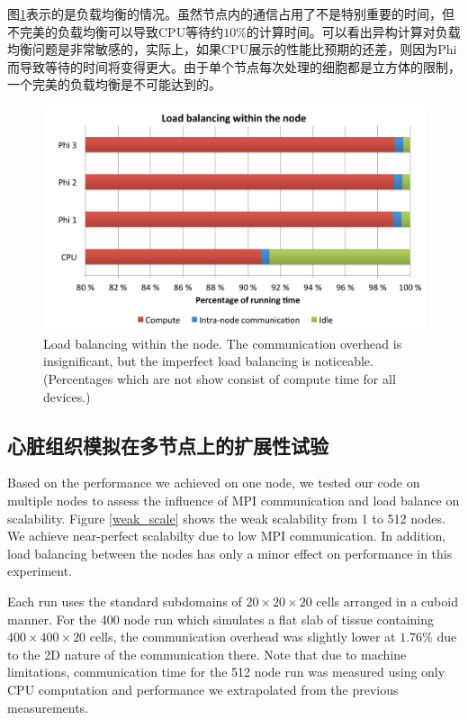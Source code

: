 图\ref{loadbalance}表示的是负载均衡的情况。虽然节点内的通信占用了不是特别重要的时间，但不完美的负载均衡可以导致CPU等待约$10\%$的计算时间。可以看出异构计算对负载均衡问题是非常敏感的，实际上，如果CPU展示的性能比预期的还差，则因为Phi而导致等待的时间将变得更大。由于单个节点每次处理的细胞都是立方体的限制，一个完美的负载均衡是不可能达到的。

\begin{figure}
 \includegraphics[width=\linewidth]{figs/loadbalance.pdf}
  \caption{Load balancing within the node. The communication overhead is insignificant, but the imperfect load balancing is noticeable. (Percentages which are not show consist of compute time for all devices.)}
  \label{loadbalance}
\end{figure}

\subsection{心脏组织模拟在多节点上的扩展性试验}

Based on the performance we achieved on one node, we tested our code on multiple nodes to assess the influence of MPI communication and load balance on scalability. Figure \ref{weak_scale} shows the weak scalability from 1 to 512 nodes. We achieve near-perfect scalabilty due to low MPI communication. In addition, load balancing between the nodes 
has only a minor effect on performance in this experiment.   

Each run uses the standard subdomains of $20\times20\times20$ cells arranged in a cuboid manner. For the 400 node run which simulates a flat slab of tissue containing 
$400\times400\times20$ cells, the communication overhead was slightly lower at $1.76\%$ due to the 2D nature of the communication there. Note that due to machine limitations, communication time for the 512 node run was measured using only CPU computation and performance we extrapolated from the previous measurements.

